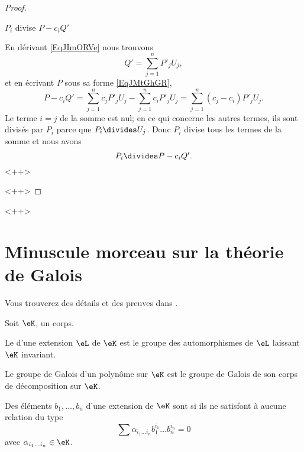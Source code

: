 \begin{proof}
\begin{subproof}
\item[\( P_i\) divise \( P-c_iQ'\)]

    En dérivant \eqref{EqJImORVe} nous trouvons
    \begin{equation}
        Q'=\sum_{j=1}^nP'_jU_j,
    \end{equation}
    et en écrivant \( P\) sous sa forme \eqref{EqJMtGhGR},
    \begin{equation}
        P-c_iQ'=\sum_{j=1}^nc_jP'_jU_j-\sum_{j=1}^nc_iP'_jU_j=\sum_{j=1}^n(c_j-c_i)P'_jU_j.
    \end{equation}
    Le terme \( i=j\) de la somme est nul; en ce qui concerne les autres termes, ils sont divisés par \( P_i\) parce que \( P_i\divides U_j\). Donc \( P_i\) divise tous les termes de la somme et nous avons
    \begin{equation}
        P_i\divides P-c_iQ'.
    \end{equation}
    <++>

        
    \end{subproof}
    <++>
\end{proof}
<++>

\section{Minuscule morceau sur la théorie de Galois}

Vous trouverez des détails et des preuves dans \cite{GalIEl}.

\begin{definition}
    Soit $\eK$, un corps.
    
    Le  d'une extension \( \eL\) de \( \eK\) est le groupe des automorphismes de \( \eL\) laissant \( \eK\) invariant. 

    Le groupe de Galois d'un polynôme sur \( \eK\) est le groupe de Galois de son corps de décomposition sur \( \eK\).
\end{definition}

\begin{definition}
    Des éléments \( b_1,\ldots, b_n\) d'une extension de \( \eK\) sont  si ils ne satisfont à aucune relation du type
    \begin{equation}
        \sum \alpha_{i_1\ldots i_n}b_1^{i_1}\ldots b_n^{i_n}=0
    \end{equation}
    avec \( \alpha_{i_1\ldots i_n}\in \eK\).
\end{definition}

